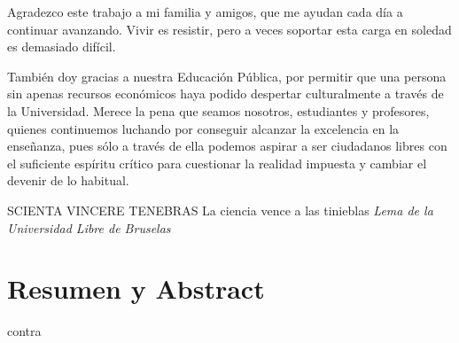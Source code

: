 \documentclass[12pt, twoside]{book}
\author{Jonathan Moreno Jiménez}
\begin{document}
\frontmatter

\portada

\begin{dedicatoria}
Agradezco este trabajo a mi familia y amigos, que me ayudan cada día a continuar avanzando. Vivir es resistir, pero a veces soportar esta carga en soledad es demasiado difícil.

\vspace{1.5cm}

También doy gracias a nuestra Educación Pública, por permitir que una persona sin apenas recursos económicos haya podido despertar culturalmente a través de la Universidad. Merece la pena que seamos nosotros, estudiantes y profesores, quienes continuemos luchando por conseguir alcanzar la excelencia en la enseñanza, pues sólo a través de ella podemos aspirar a ser ciudadanos libres con el suficiente espíritu crítico para cuestionar la realidad impuesta y cambiar el devenir de lo habitual.

\vspace{1.5cm}

SCIENTA VINCERE TENEBRAS
\newline La ciencia vence a las tinieblas
\newline \footnotesize{\textit{Lema de la Universidad Libre de Bruselas}}
   
\end{dedicatoria}





\chapter*{Resumen y Abstract}



\mainmatter













\appendix



\clearpage
\backmatter

 {contra}
\end{document}
